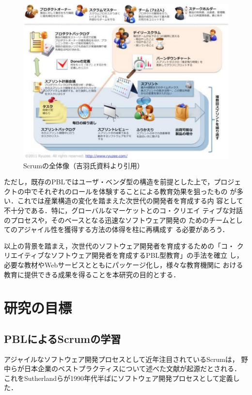 \documentclass[a4j,9pt,twoside]{jarticle}
\begin{document}
\begin{multicols}{2}
\begin{figure}
\begin{center}
\includegraphics[width=0.8\linewidth]{figs/scrum.pdf}
\caption{Scrumの全体像（吉羽氏資料より引用）}
\label{fig:scrum}
\end{center}
\end{figure}

    ただし，既存のPBLではユーザ・ベンダ型の構造を前提とした上で，プロジェ
    クトの中でそれぞれのロールを体験することによる教育効果を狙ったもの
    が多い．これでは産業構造の変化を踏まえた次世代の開発者を育成する内
    容として不十分である．特に，グローバルなマーケットとのコ・クリエイ
    ティブな対話のプロセスや，そのベースとなる迅速なソフトウェア開発の
    ためのチームとしてのアジャイル性を獲得する方法の体得を柱に再構成す
    る必要があろう．
    
    以上の背景を踏まえ，次世代のソフトウェア開発者を育成するための「コ・
    クリエイティブなソフトウェア開発者を育成するPBL型教育」の手法を確立
    し，必要な教材やWebサービスとともにパッケージ化し，様々な教育機関に
    おける教育に提供できる成果を得ることを本研究の目的とする．

\section{研究の目標}\label{sec:method}
\subsection{PBLによるScrumの学習}
	アジャイルなソフトウェア開発プロセスとして近年注目されているScrumは，
	野中らが日本企業のベストプラクティスについて述べた文献\cite{nonaka}が起源だとされる．
	これをSutherlandらが1990年代半ばにソフトウェア開発プロセスとして定義した．
	

\end{multicols}
\end{document}
